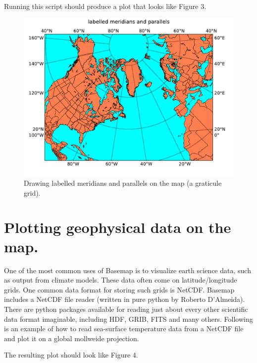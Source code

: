 

Running this script should produce a plot that looks like Figure 3.

\begin{figure}[h]
\includegraphics[scale=0.75]{fig/basemap4}

\caption{Drawing labelled meridians and parallels on the map (a graticule grid).}

\end{figure}


\section{Plotting geophysical data on the map.}

One of the most common uses of Basemap is to visualize earth science
data, such as output from climate models. These data often come on
latitude/longitude grids. One common data format for storing such
grids is NetCDF. Basemap includes a NetCDF file reader (written in
pure python by Roberto D'Almeida). There are python packages available
for reading just about every other scientific data format imaginable,
including HDF, GRIB, FITS and many others. Following is an example
of how to read sea-surface temperature data from a NetCDF file and
plot it on a global mollweide projection.



The resulting plot should look like Figure 4.

